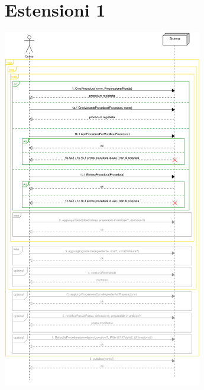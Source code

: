 \section*{Estensioni 1}
\includegraphics[max width=\textwidth, max height=158mm]{../resources/img/GRP/SSD/ext1.png}

